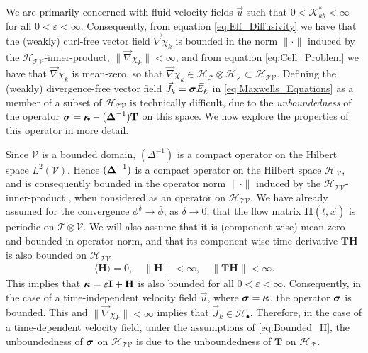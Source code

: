 \documentclass[11pt]{amsart}
\newcommand{\Tb}{\mathbf{T}}
\newcommand{\Hb}{\mathbf{H}}
\newcommand{\Ib}{\mathbf{I}}
\newcommand{\Kc}{\mathcal{K}}
\newcommand{\Tc}{\mathcal{T}}
\newcommand{\Vc}{\mathcal{V}}
\newcommand{\Hs}{\mathscr{H}}
\newcommand\bsig{\mbox{\boldmath${\sigma}$}}
\newcommand\bDelta{\mbox{\boldmath${\Delta}$}}
\newcommand\bkappa{\mbox{\boldmath${\kappa}$}}
\begin{document}
We are primarily concerned with fluid velocity fields $\vec{u}$ such
that $0<\Kc^*_{kk}<\infty$ for all $0<\varepsilon<\infty$. Consequently, from equation
\eqref{eq:Eff_Diffusivity} we have that the (weakly)
curl-free vector field $\vec{\nabla}\chi_k$ is bounded in the norm $\|\cdot\|$
induced by the $\Hs_{\Tc\Vc}$-inner-product, $\|\vec{\nabla}\chi_k\|<\infty$, and
from equation \eqref{eq:Cell_Problem} we have that $\vec{\nabla}\chi_k$ is
mean-zero, so that
$\vec{\nabla}\chi_k\in\Hs_{\,\Tc}\otimes\Hs_\times\subset\Hs_{\Tc\Vc}$. Defining the (weakly) 
divergence-free vector field $\vec{J}_k=\bsig\vec{E}_k$ in
\eqref{eq:Maxwells_Equations} as a member of a subset of
$\Hs_{\Tc\Vc}$ is technically difficult, due to the
\emph{unboundedness} of the operator $\bsig=\bkappa-(\bDelta^{-1})\Tb$ on
this space. We now explore the properties of this operator in more
detail. 





Since $\Vc$ is a bounded domain, $(\Delta^{-1})$ is a compact operator
\cite{Stakgold:BVP:2000} on the Hilbert space $L^2(\Vc)$. Hence
$(\bDelta^{-1})$ is a compact operator on the Hilbert space
$\Hs_{\,\Vc}$, and is consequently bounded in the operator norm $\|\cdot\|$
induced by the $\Hs_{\Tc\Vc}$-inner-product
\cite{Reed-1980,Stone:64,Stakgold:BVP:2000}, when considered as an 
operator on $\Hs_{\Tc\Vc}$.  We have already assumed 
for the convergence $\phi^\delta\to\bar{\phi}$, as $\delta\to0$, that the flow matrix
$\Hb(t,\vec{x})$ is periodic on $\Tc\otimes\Vc$. We will also assume that it
is (component-wise) mean-zero and bounded in operator norm, and that
its component-wise time derivative $\Tb\Hb$ is also bounded on
$\Hs_{\Tc\Vc}$ 
%
\begin{align}\label{eq:Bounded_H}
  \langle\Hb\rangle=0, \quad \|\Hb\|<\infty, \quad \|\Tb\Hb\|<\infty.
\end{align}
%
This implies that $\bkappa=\varepsilon\Ib+\Hb$ is also bounded for all
$0<\varepsilon<\infty$. Consequently, in the case of a time-independent velocity 
field $\vec{u}$, where $\bsig=\bkappa$, the operator $\bsig$ is
bounded. This and $\|\vec{\nabla}\chi_k\|<\infty$ implies that
$\vec{J}_k\in\Hs_\bullet$. Therefore, in the case of a time-dependent velocity
field, under the assumptions of \eqref{eq:Bounded_H}, the
unboundedness of $\bsig$ on $\Hs_{\Tc\Vc}$  is due to the
unboundedness of $\Tb$ on $\Hs_{\,\Tc}$.   
\end{document}
